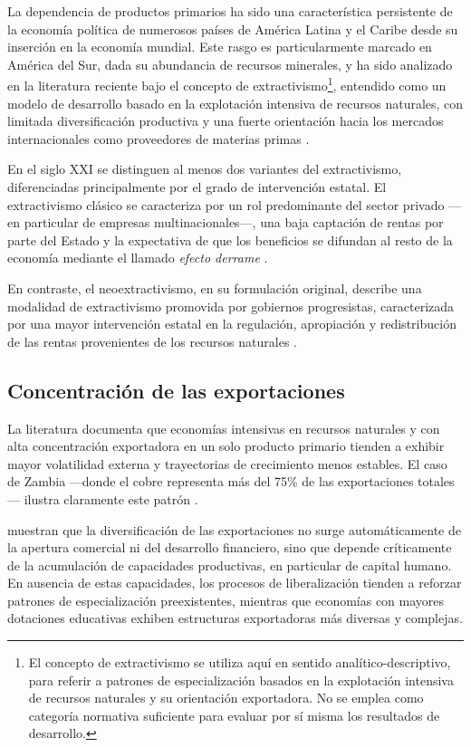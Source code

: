 \documentclass[../../PTFM.tex]{subfiles}
\begin{document}
	La dependencia de productos primarios ha sido una característica persistente de la economía política de numerosos países de América Latina y el Caribe desde su inserción en la economía mundial. Este rasgo es particularmente marcado en América del Sur, dada su abundancia de recursos minerales, y ha sido analizado en la literatura reciente bajo el concepto de extractivismo\footnote{El concepto de extractivismo se utiliza aquí en sentido analítico-descriptivo, para referir a patrones de especialización basados en la explotación intensiva de recursos naturales y su orientación exportadora. No se emplea como categoría normativa suficiente para evaluar por sí misma los resultados de desarrollo.}, entendido como un modelo de desarrollo basado en la explotación intensiva de recursos naturales, con limitada diversificación productiva y una fuerte orientación hacia los mercados internacionales como proveedores de materias primas \parencite{Agramont-Lechn2024}.
	
	En el siglo XXI se distinguen al menos dos variantes del extractivismo, diferenciadas principalmente por el grado de intervención estatal. El extractivismo clásico se caracteriza por un rol predominante del sector privado —en particular de empresas multinacionales—, una baja captación de rentas por parte del Estado y la expectativa de que los beneficios se difundan al resto de la economía mediante el llamado \textit{efecto derrame} \parencite{Gudynas2018}.
	
	En contraste, el neoextractivismo, en su formulación original, describe una modalidad de extractivismo promovida por gobiernos progresistas, caracterizada por una mayor intervención estatal en la regulación, apropiación y redistribución de las rentas provenientes de los recursos naturales \parencite{Gudynas2018}.
	
	\subsection{Concentración de las exportaciones}
	\label{subsec:concentracion-exportaciones}
	
	La literatura documenta que economías intensivas en recursos naturales y con alta concentración exportadora en un solo producto primario tienden a exhibir mayor volatilidad externa y trayectorias de crecimiento menos estables. El caso de Zambia —donde el cobre representa más del 75\% de las exportaciones totales— ilustra claramente este patrón \parencite{Lwazi2022}.
	
	\textcite{Agosin2012} muestran que la diversificación de las exportaciones no surge automáticamente de la apertura comercial ni del desarrollo financiero, sino que depende críticamente de la acumulación de capacidades productivas, en particular de capital humano. En ausencia de estas capacidades, los procesos de liberalización tienden a reforzar patrones de especialización preexistentes, mientras que economías con mayores dotaciones educativas exhiben estructuras exportadoras más diversas y complejas.
	
\end{document}
